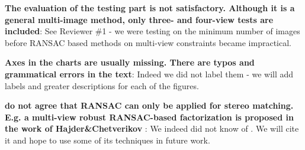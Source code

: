 \documentclass[10pt,twocolumn,letterpaper]{article}
\begin{document}
\textbf{The evaluation of the testing part is not satisfactory. Although it is a general multi-image method, only three- and four-view tests are included}:
See Reviewer \#1 - we were testing on the minimum number of images before RANSAC based methods on multi-view constraints became impractical.

\textbf{Axes in the charts are usually missing. There are typos and grammatical errors in the text}:
Indeed we did not label them - we will add labels and greater descriptions for each of the figures.

\textbf{ do not agree that RANSAC can only be applied for stereo matching. E.g. a multi-view robust RANSAC-based factorization is proposed in the work of Hajder\&Chetverikov }:
We indeed did not know of \cite{hajder2006weak}. We will cite it and hope to use some of its techniques in future work.
\end{document}
